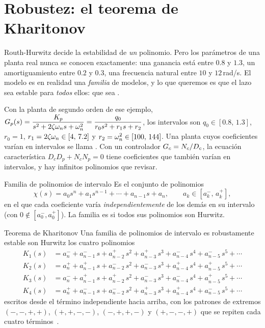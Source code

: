 \section{Robustez: el teorema de Kharitonov}
\label{sec:es-kharitonov}

Routh-Hurwitz decide la estabilidad de \emph{un} polinomio. Pero los parámetros de una planta real nunca se conocen exactamente: una ganancia está entre $0.8$ y $1.3$, un amortiguamiento entre $0.2$ y $0.3$, una frecuencia natural entre $10$ y $12$\,rad/s. El modelo es en realidad una \emph{familia} de modelos, y lo que queremos es que el lazo sea estable para \emph{todos} ellos: que sea .

Con la planta de segundo orden de ese ejemplo, $G_p(s)=\dfrac{K_p}{s^2+2\zeta\omega_n s+\omega_n^2}=\dfrac{q_0}{r_0s^2+r_1s+r_2}$, los intervalos son $q_0\in[0.8,\,1.3]$, $r_0=1$, $r_1=2\zeta\omega_n\in[4,\,7.2]$ y $r_2=\omega_n^2\in[100,\,144]$. Una planta cuyos coeficientes varían en intervalos se llama . Con un controlador $G_c=N_c/D_c$, la ecuación característica $D_cD_p+N_cN_p=0$ tiene coeficientes que también varían en intervalos, y hay infinitos polinomios que revisar.

\begin{definicion}[label=def:es-intervalo]{Familia de polinomios de intervalo}
Es el conjunto de polinomios
\[
  \chi(s)=a_0s^n+a_1s^{n-1}+\cdots+a_{n-1}s+a_n,\qquad a_k\in[a_k^-,\,a_k^+],
\]
en el que cada coeficiente varía \emph{independientemente} de los demás en su intervalo (con $0\notin[a_0^-,a_0^+]$). La familia es  si todos sus polinomios son Hurwitz.
\end{definicion}

\begin{definicion}[label=def:es-kharitonov]{Teorema de Kharitonov}
Una familia de polinomios de intervalo es robustamente estable  son Hurwitz los cuatro polinomios
\[
\begin{aligned}
  K_1(s)&=a_n^-+a_{n-1}^-\,s+a_{n-2}^+\,s^2+a_{n-3}^+\,s^3+a_{n-4}^-\,s^4+a_{n-5}^-\,s^5+\cdots\\
  K_2(s)&=a_n^++a_{n-1}^+\,s+a_{n-2}^-\,s^2+a_{n-3}^-\,s^3+a_{n-4}^+\,s^4+a_{n-5}^+\,s^5+\cdots\\
  K_3(s)&=a_n^-+a_{n-1}^+\,s+a_{n-2}^+\,s^2+a_{n-3}^-\,s^3+a_{n-4}^-\,s^4+a_{n-5}^+\,s^5+\cdots\\
  K_4(s)&=a_n^++a_{n-1}^-\,s+a_{n-2}^-\,s^2+a_{n-3}^+\,s^3+a_{n-4}^+\,s^4+a_{n-5}^-\,s^5+\cdots
\end{aligned}
\]
escritos desde el término independiente hacia arriba, con los patrones de extremos $(-,-,+,+)$, $(+,+,-,-)$, $(-,+,+,-)$ y $(+,-,-,+)$ que se repiten cada cuatro términos~\citep{Kha78}.
\end{definicion}


